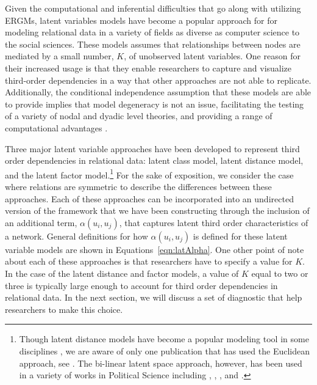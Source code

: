 Given the computational and inferential difficulties that go along with utilizing ERGMs, latent variables models have become a popular approach for for modeling relational data in a variety of fields as diverse as computer science to the social sciences. These models assumes that relationships between nodes are mediated by a small number, $K$, of unobserved latent variables. One reason for their increased usage is that they enable researchers to capture and visualize third-order dependencies in a way that other approaches are not able to replicate. Additionally, the conditional independence assumption that these models are able to provide implies that model degeneracy is not an issue, facilitating the testing of a variety of nodal and dyadic level theories, and providing a range of computational advantages \citep{hunter:etal:2012}. 

Three major latent variable approaches have been developed to represent third order dependencies in relational data: latent class model, latent distance model, and the latent factor model.\footnote{Though latent distance models have become a popular modeling tool in some disciplines \citep{salter:etal:2012}, we are aware of only one publication that has used the Euclidean approach, see \citet{kirkland:2012}. The bi-linear latent space approach, however, has been used in a variety of works in Political Science including \citet{ward:etal:2007}, \citet{cao:2009}, \citet{breunig:etal:2012}, and \citet{metternich:etal:2015}.} For the sake of exposition, we consider the case where relations are symmetric to describe the differences between these approaches. Each of these approaches can be incorporated into an undirected version of the framework that we have been constructing through the inclusion of an additional term, $\alpha(u_{i}, u_{j})$, that captures latent third order characteristics of a network. General definitions for how $\alpha(u_{i}, u_{j})$ is defined for these latent variable models are shown in Equations~\ref{eqn:latAlpha}. One other point of note about each of these approaches is that researchers have to specify a value for $K$. In the case of the latent distance and factor models, a value of $K$ equal to two or three is typically large enough to account for third order dependencies in relational data. In the next section, we will discuss a set of diagnostic that help researchers to make this choice.

